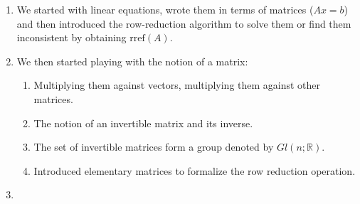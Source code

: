 
 
 \begin{enumerate}
        \item We started with linear equations, wrote them in terms of matrices ($A x = b$) and then introduced the row-reduction algorithm to solve them or find them inconsistent by obtaining $\text{rref}(A)$.
        \item We then started playing with the notion of a matrix:
        \begin{enumerate}
            \item Multiplying them against vectors, multiplying them against other matrices.
            \item The notion of an invertible matrix and its inverse.
            \item The set of invertible matrices form a group denoted by $Gl(n; \mathbb{R})$.
            \item Introduced elementary matrices to formalize the row reduction operation.
        \end{enumerate}
        \item


\end{enumerate}
